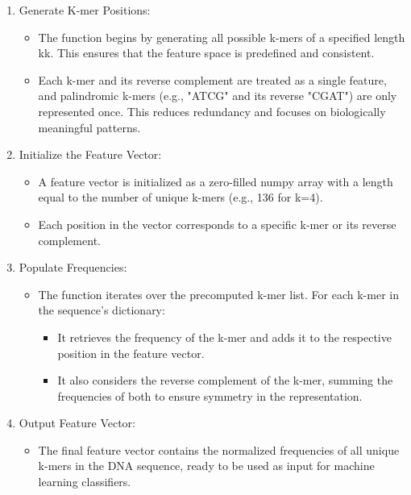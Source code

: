 \documentclass[11pt, a4paper, hidelinks]{article}
\begin{document}
\begin{enumerate}

    \item Generate K-mer Positions:
    \begin{itemize}
        \item The function begins by generating all possible k-mers of a specified length kk. This ensures that the feature space is predefined and consistent.
        \item Each k-mer and its reverse complement are treated as a single feature, and palindromic k-mers (e.g., "ATCG" and its reverse "CGAT") are only represented once. This reduces redundancy and focuses on biologically meaningful patterns.
    \end{itemize}

    \item Initialize the Feature Vector:

    \begin{itemize}
        \item A feature vector is initialized as a zero-filled numpy array with a length equal to the number of unique k-mers (e.g., 136 for k=4).
        \item Each position in the vector corresponds to a specific k-mer or its reverse complement.
    \end{itemize}

    \item Populate Frequencies:

    \begin{itemize}
        \item The function iterates over the precomputed k-mer list. For each k-mer in the sequence's dictionary:
        \begin{itemize}
            \item It retrieves the frequency of the k-mer and adds it to the respective position in the feature vector.
            \item It also considers the reverse complement of the k-mer, summing the frequencies of both to ensure symmetry in the representation.
        \end{itemize}
    \end{itemize}

    \item Output Feature Vector:
    \begin{itemize}
        \item The final feature vector contains the normalized frequencies of all unique k-mers in the DNA sequence, ready to be used as input for machine learning classifiers.
    \end{itemize}
\end{enumerate}
\end{document}
